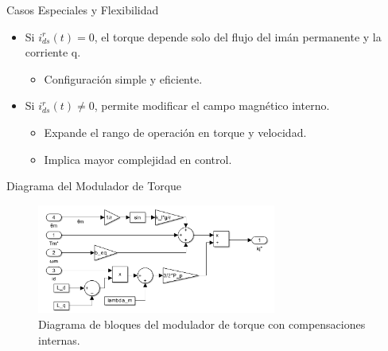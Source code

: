 \documentclass[12pt]{beamer}
\begin{document}
\begin{frame}{Casos Especiales y Flexibilidad}
    \begin{itemize}
        \item Si $i_{ds}^r(t)=0$, el torque depende solo del flujo del imán permanente y la corriente q.
        \begin{itemize}
            \item Configuración simple y eficiente.
        \end{itemize}
        \item Si $i_{ds}^r(t)\neq 0$, permite modificar el campo magnético interno.
        \begin{itemize}
            \item Expande el rango de operación en torque y velocidad.
            \item Implica mayor complejidad en control.
        \end{itemize}
    \end{itemize}
\end{frame}

\begin{frame}{Diagrama del Modulador de Torque}
    \begin{figure}[H]
        \centering
        \includegraphics[width=0.7\textwidth]{Imagenes/modulador_torque.png}
        \caption{Diagrama de bloques del modulador de torque con compensaciones internas.}
        \label{fig:modulador_torque_1}
    \end{figure}
\end{frame}
\end{document}
